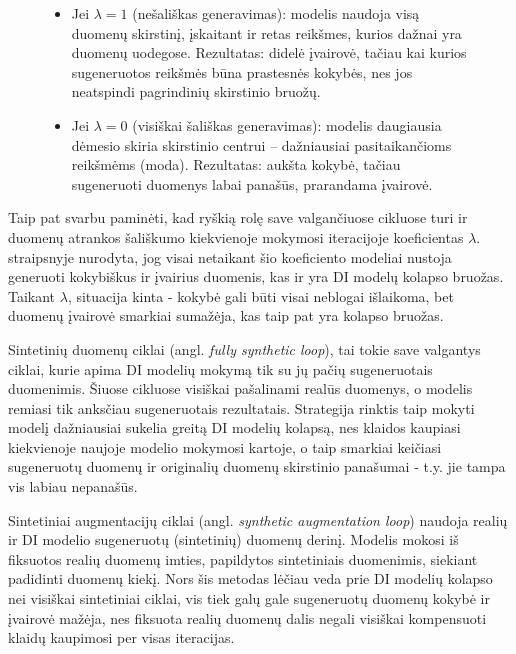 \documentclass{VUMIFInfKursinis}
\begin{document}
\begin{figure}[H]
    \begin{itemize}
        \item Jei \textbf{\textcolor{raudona}{\(\lambda = 1 \)}} (nešališkas generavimas): modelis naudoja visą duomenų skirstinį, įskaitant ir retas reikšmes, kurios dažnai yra duomenų uodegose. Rezultatas: didelė įvairovė, tačiau kai kurios sugeneruotos reikšmės būna prastesnės kokybės, nes jos neatspindi pagrindinių skirstinio bruožų.
        \item Jei \textbf{\textcolor{raudona}{\(\lambda = 0 \)}} (visiškai šališkas generavimas): modelis daugiausia dėmesio skiria skirstinio centrui – dažniausiai pasitaikančioms reikšmėms (moda). Rezultatas: aukšta kokybė, tačiau sugeneruoti duomenys labai panašūs, prarandama įvairovė.
    \end{itemize}
\end{figure}




Taip pat svarbu paminėti, kad ryškią rolę save valgančiuose cikluose turi ir duomenų atrankos šališkumo kiekvienoje mokymosi iteracijoje koeficientas \(\lambda \). \cite{ModelsGoMAD} straipsnyje nurodyta, jog visai netaikant šio koeficiento modeliai nustoja generuoti kokybiškus ir įvairius duomenis, kas ir yra DI modelų kolapso bruožas. Taikant \(\lambda\), situacija kinta - kokybė gali būti visai neblogai išlaikoma, bet duomenų įvairovė smarkiai sumažėja, kas taip pat yra kolapso bruožas. 


Sintetinių duomenų ciklai (angl. \textsl{fully synthetic loop}), tai tokie save valgantys ciklai, kurie apima DI modelių mokymą tik su jų pačių sugeneruotais duomenimis. Šiuose cikluose visiškai pašalinami realūs duomenys, o modelis remiasi tik anksčiau sugeneruotais rezultatais. Strategija rinktis taip mokyti modelį  dažniausiai sukelia greitą DI modelių kolapsą, nes klaidos kaupiasi kiekvienoje naujoje modelio mokymosi kartoje, o taip smarkiai keičiasi sugeneruotų duomenų ir originalių duomenų skirstinio panašumai - t.y. jie tampa vis labiau nepanašūs.



Sintetiniai augmentacijų ciklai (angl. \textsl{synthetic augmentation loop}) naudoja realių ir DI modelio sugeneruotų (sintetinių) duomenų derinį. Modelis mokosi iš fiksuotos realių duomenų imties, papildytos sintetiniais duomenimis, siekiant padidinti duomenų kiekį. Nors šis metodas lėčiau veda prie DI modelių kolapso nei visiškai sintetiniai ciklai, vis tiek galų gale sugeneruotų duomenų kokybė ir įvairovė mažėja, nes fiksuota realių duomenų dalis negali visiškai kompensuoti klaidų kaupimosi per visas iteracijas.
\end{document}
